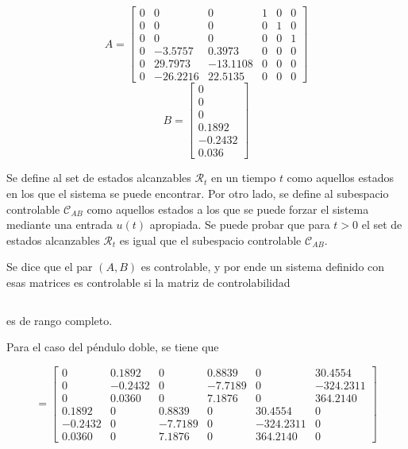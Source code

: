 \begin{equation}
 A = \begin{bmatrix}
0 &  0 & 0 & 1 &  0 & 0\\
0 &  0 & 0 & 0 &  1 & 0\\
0 &  0 & 0 & 0 &  0 & 1\\
0 &  -3.5757 & 0.3973 & 0 &  0 & 0\\
0 &  29.7973 & -13.1108 & 0 &  0 & 0\\
0 &  -26.2216 & 22.5135 & 0 &  0 & 0
\end{bmatrix}
\end{equation}
\begin{equation}
 B = \begin{bmatrix}
0 \\
0 \\
0 \\
0.1892 \\
-0.2432 \\
0.036 
\end{bmatrix}
\end{equation}

\label{sec:ctrbyobsv}

Se define al set de estados alcanzables $\mathcal{R}_t$ en un tiempo $t$ como aquellos estados en los que el sistema se puede encontrar. Por otro lado, se define al subespacio controlable $\mathcal{C}_{AB}$ como aquellos estados a los que se puede forzar el sistema mediante una entrada $u(t)$ apropiada. Se puede probar que para $t > 0$ el set de estados alcanzables $\mathcal{R}_t$ es igual que el subespacio controlable $\mathcal{C}_{AB}$. \cite{ref:dullerud}

Se dice que el par $(A, B)$ es controlable, y por ende un sistema definido con esas matrices es controlable si la matriz de controlabilidad

\begin{equation}
[B \ AB \ \cdots \ A^{n-1}B]
\end{equation}

es de rango completo.

Para el caso del péndulo doble, se tiene que

\begin{equation}
[B \ AB \ \cdots \ A^{n-1}B] = 	\begin{bmatrix}
0       &  0.1892  & 0        & 0.8839  &  0         & 30.4554\\
0       &  -0.2432 & 0        & -7.7189 &  0         & -324.2311\\
0       &  0.0360  & 0        & 7.1876  &  0         & 364.2140\\
0.1892  &  0       & 0.8839   & 0       &  30.4554   & 0\\
-0.2432 &  0       & -7.7189  & 0       &  -324.2311 & 0\\
0.0360  &  0       & 7.1876   & 0       &  364.2140  & 0
\end{bmatrix}
\end{equation}


